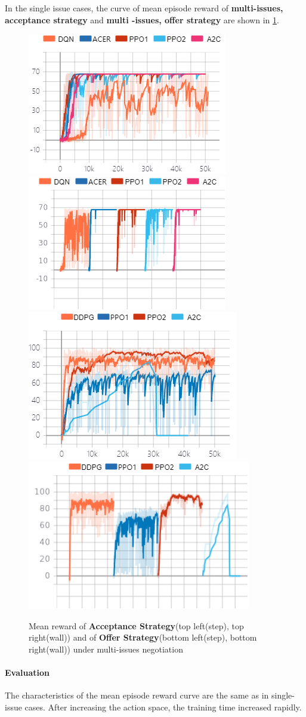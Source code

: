 In the single issue cases, the curve of mean episode reward of \textbf{multi-issues, acceptance strategy} and \textbf{multi -issues, offer strategy} are shown in \ref{fig:multi-issues}. 
\begin{figure}
    \includegraphics[width=.40\textwidth]{./images/ac_s_multi_issues.png}\hfill
    \includegraphics[width=.40\textwidth]{./images/ac_s_multi_issues_wall.png}
    \\[\smallskipamount]
    \includegraphics[width=.40\textwidth]{./images/of_s_multi_issues.png}\hfill
    \includegraphics[width=.40\textwidth]{./images/of_s_multi_issues_wall.png}
    \caption{Mean reward of \textbf{Acceptance Strategy}(top left(step), top right(wall)) and of \textbf{Offer Strategy}(bottom left(step), bottom right(wall)) under multi-issues negotiation}
		\label{fig:multi-issues}
\end{figure}

\paragraph{Evaluation} The characteristics of the mean episode reward curve are the same as in single-issue cases. After increasing the action space, the training time increased rapidly. 

